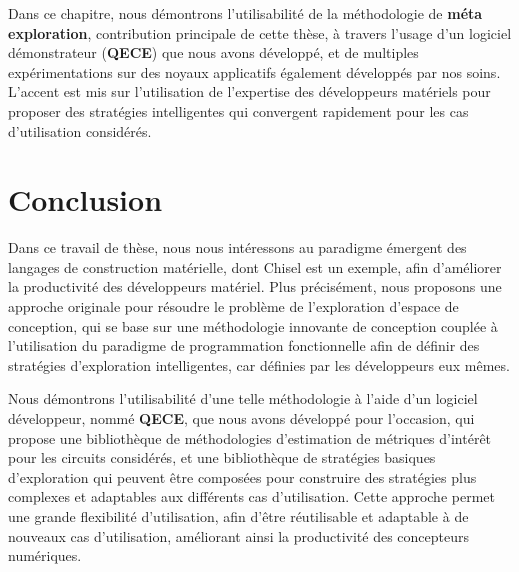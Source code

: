     Dans ce chapitre, nous démontrons l'utilisabilité de la méthodologie de {\bf méta exploration}, contribution principale de cette thèse, à travers l'usage d'un logiciel démonstrateur ({\bf QECE}) que nous avons développé, et de multiples expérimentations sur des noyaux applicatifs également développés par nos soins.
    L'accent est mis sur l'utilisation de l'expertise des développeurs matériels pour proposer des stratégies intelligentes qui convergent rapidement pour les cas d'utilisation considérés.

\section{Conclusion}
\label{ch.resume:sec.conclusion}
    Dans ce travail de thèse, nous nous intéressons au paradigme émergent des langages de construction matérielle, dont Chisel est un exemple, afin d'améliorer la productivité des développeurs matériel.
    Plus précisément, nous proposons une approche originale pour résoudre le problème de l'exploration d'espace de conception, qui se base sur une méthodologie innovante de conception couplée à l'utilisation du paradigme de programmation fonctionnelle afin de définir des stratégies d'exploration intelligentes, car définies par les développeurs eux mêmes.

    Nous démontrons l'utilisabilité d'une telle méthodologie à l'aide d'un logiciel développeur, nommé {\bf QECE}, que nous avons développé pour l'occasion, qui propose une bibliothèque de méthodologies d'estimation de métriques d'intérêt pour les circuits considérés, et une bibliothèque de stratégies basiques d'exploration qui peuvent être composées pour construire des stratégies plus complexes et adaptables aux différents cas d'utilisation.
    Cette approche permet une grande flexibilité d'utilisation, afin d'être réutilisable et adaptable à de nouveaux cas d'utilisation, améliorant ainsi la productivité des concepteurs numériques.

